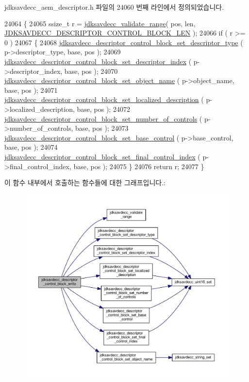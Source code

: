 jdksavdecc\+\_\+aem\+\_\+descriptor.\+h 파일의 24060 번째 라인에서 정의되었습니다.


\begin{DoxyCode}
24064 \{
24065     ssize\_t r = \hyperlink{group__util_ga9c02bdfe76c69163647c3196db7a73a1}{jdksavdecc\_validate\_range}( pos, len, 
      \hyperlink{group__descriptor__control__block_gaff7f491436a268217f239cfe713a71c4}{JDKSAVDECC\_DESCRIPTOR\_CONTROL\_BLOCK\_LEN} );
24066     \textcolor{keywordflow}{if} ( r >= 0 )
24067     \{
24068         \hyperlink{group__descriptor__control__block_ga633ee6de1d02835338736f2e6b8ee5dd}{jdksavdecc\_descriptor\_control\_block\_set\_descriptor\_type}
      ( p->descriptor\_type, base, pos );
24069         \hyperlink{group__descriptor__control__block_ga670094cb2f68cc54d49d04c395bfd89b}{jdksavdecc\_descriptor\_control\_block\_set\_descriptor\_index}
      ( p->descriptor\_index, base, pos );
24070         \hyperlink{group__descriptor__control__block_ga50d7c283c90b9225662e51b255c8e94a}{jdksavdecc\_descriptor\_control\_block\_set\_object\_name}
      ( p->object\_name, base, pos );
24071         \hyperlink{group__descriptor__control__block_ga95b9325d1e7addfc52709f622e01cb07}{jdksavdecc\_descriptor\_control\_block\_set\_localized\_description}
      ( p->localized\_description, base, pos );
24072         \hyperlink{group__descriptor__control__block_ga711539be574408e567d2c1a8e4eb8c68}{jdksavdecc\_descriptor\_control\_block\_set\_number\_of\_controls}
      ( p->number\_of\_controls, base, pos );
24073         \hyperlink{group__descriptor__control__block_gaf35ea9253fe8d648f8ffc888af5cacfb}{jdksavdecc\_descriptor\_control\_block\_set\_base\_control}
      ( p->base\_control, base, pos );
24074         \hyperlink{group__descriptor__control__block_ga53eb39132c43c4d04a4a4a991ae67448}{jdksavdecc\_descriptor\_control\_block\_set\_final\_control\_index}
      ( p->final\_control\_index, base, pos );
24075     \}
24076     \textcolor{keywordflow}{return} r;
24077 \}
\end{DoxyCode}


이 함수 내부에서 호출하는 함수들에 대한 그래프입니다.\+:
\nopagebreak
\begin{figure}[H]
\begin{center}
\leavevmode
\includegraphics[width=350pt]{group__descriptor__control__block_ga905ece8f424fe220cc58d70b32814937_cgraph}
\end{center}
\end{figure}


